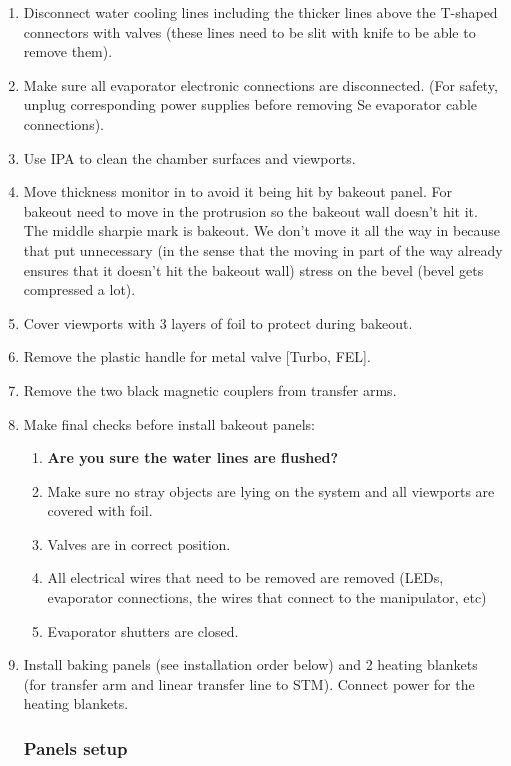 \begin{enumerate}
\item	Disconnect water cooling lines including the thicker lines above the T-shaped connectors with valves (these lines need to be slit with knife to be able to remove them). 
\item	Make sure all evaporator electronic connections are disconnected. (For safety, unplug corresponding power supplies before removing Se evaporator cable connections). 
\item	Use IPA to clean the chamber surfaces and viewports.
\item	Move thickness monitor in to avoid it being hit by bakeout panel. For bakeout need to move in the protrusion so the bakeout wall doesn’t hit it. The middle sharpie mark is bakeout. We don’t move it all the way in because that put unnecessary (in the sense that the moving in part of the way already ensures that it doesn’t hit the bakeout wall) stress on the bevel (bevel gets compressed a lot).
\item	Cover viewports with 3 layers of foil to protect during bakeout.
\item	Remove the plastic handle for metal valve [Turbo, FEL].
\item   Remove the two black magnetic couplers from transfer arms. 
\item	Make final checks before install bakeout panels: 
\begin{enumerate}
	\item \textbf{Are you sure the water lines are flushed?}
	\item Make sure no stray objects are lying on the system and all viewports are covered with foil.
	\item Valves are in correct position.
	\item All electrical wires that need to be removed are removed (LEDs, evaporator connections, the wires that connect to the manipulator, etc)
	\item Evaporator shutters are closed.
\end{enumerate}
\item	Install baking panels (see installation order below) and 2 heating blankets (for transfer arm and linear transfer line to STM). Connect power for the heating blankets.
\subsubsection*{Panels setup}


\end{enumerate}
